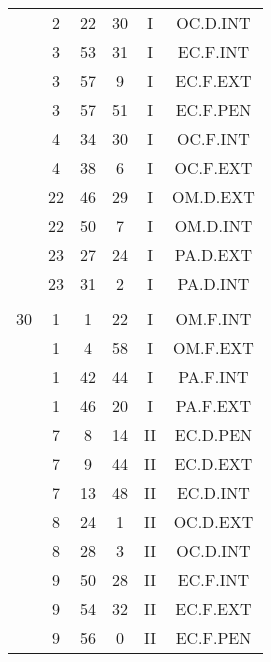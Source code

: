 \documentclass[12pt, a4paper]{article}
\begin{document}
\begin{multicols}{3}
{\begin{tabular}{c c c c c c}
	 	 	 	 & 2 & 22 & 30 & I & OC.D.INT\\%
	 	 	 	 & 3 & 53 & 31 & I & EC.F.INT\\%
	 	 	 	 & 3 & 57 & 9 & I & EC.F.EXT\\%
	 	 	 	 & 3 & 57 & 51 & I & EC.F.PEN\\%
	 	 	 	 & 4 & 34 & 30 & I & OC.F.INT\\%
	 	 	 	 & 4 & 38 & 6 & I & OC.F.EXT\\%
	 	 	 	 & 22 & 46 & 29 & I & OM.D.EXT\\%
	 	 	 	 & 22 & 50 & 7 & I & OM.D.INT\\%
	 	 	 	 & 23 & 27 & 24 & I & PA.D.EXT\\%
	 	 	 	 & 23 & 31 & 2 & I & PA.D.INT\\%
	 	 	 	 & & & & & \\%
	 	 	 	30 & 1 & 1 & 22 & I & OM.F.INT\\%
	 	 	 	 & 1 & 4 & 58 & I & OM.F.EXT\\%
	 	 	 	 & 1 & 42 & 44 & I & PA.F.INT\\%
	 	 	 	 & 1 & 46 & 20 & I & PA.F.EXT\\%
	 	 	 	 & 7 & 8 & 14 & II & EC.D.PEN\\%
	 	 	 	 & 7 & 9 & 44 & II & EC.D.EXT\\%
	 	 	 	 & 7 & 13 & 48 & II & EC.D.INT\\%
	 	 	 	 & 8 & 24 & 1 & II & OC.D.EXT\\%
	 	 	 	 & 8 & 28 & 3 & II & OC.D.INT\\%
	 	 	 	 & 9 & 50 & 28 & II & EC.F.INT\\%
	 	 	 	 & 9 & 54 & 32 & II & EC.F.EXT\\%
	 	 	 	 & 9 & 56 & 0 & II & EC.F.PEN\\%

\end{tabular}}
\end{multicols}
\end{document}
